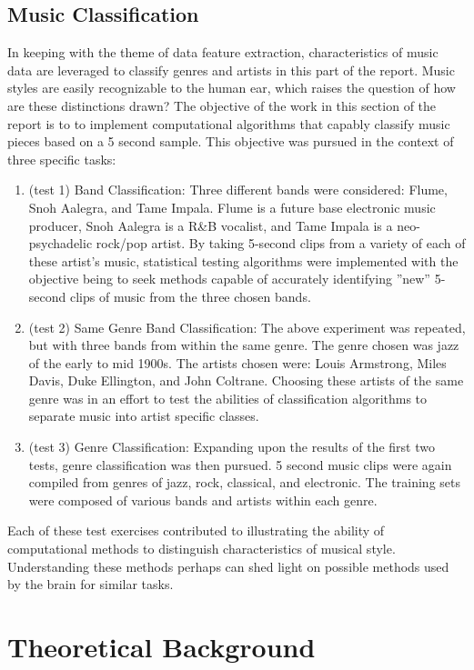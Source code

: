 \documentclass{article}
\begin{document}
\subsection{Music Classification}
In keeping with the theme of data feature extraction, characteristics of music data are leveraged to classify genres and artists in this part of the report. Music styles are easily recognizable to the human ear, which raises the question of how are these distinctions drawn? The objective of the work in this section of the report is to to implement computational algorithms that capably classify music pieces based on a 5 second sample. This objective was pursued in the context of three specific tasks:

\begin{enumerate}
    \item (test 1) Band Classification: Three different bands were considered: Flume, Snoh Aalegra, and Tame Impala. Flume is a future base electronic music producer, Snoh Aalegra is a R\&B vocalist, and Tame Impala is a neo-psychadelic rock/pop artist. By taking 5-second clips from a variety of each of these artist's music, statistical testing algorithms were implemented with the objective being to seek methods capable of accurately identifying ”new” 5-second clips of music from the three chosen bands.
    \item (test 2) Same Genre Band Classification: The above experiment was repeated, but with three bands from within the same genre. The genre chosen was jazz of the early to mid 1900s. The artists chosen were: Louis Armstrong, Miles Davis, Duke Ellington, and John Coltrane. Choosing these artists of the same genre was in an effort to test the abilities of classification algorithms to separate music into artist specific classes.
    \item (test 3) Genre Classification: Expanding upon the results of the first two tests, genre classification was then pursued. 5 second music clips were again compiled from genres of jazz, rock, classical, and electronic. The training sets were composed of various bands and artists within each genre.
\end{enumerate}
Each of these test exercises contributed to illustrating the ability of computational methods to distinguish characteristics of musical style. Understanding these methods perhaps can shed light on possible methods used by the brain for similar tasks.


\section{Theoretical Background}
\end{document}
